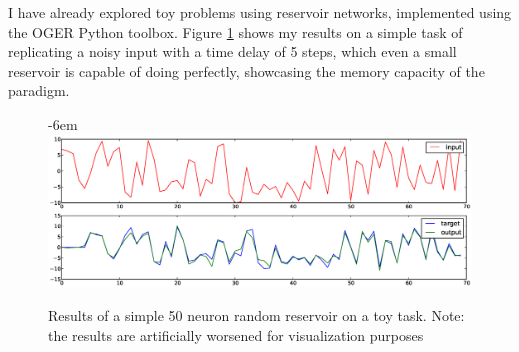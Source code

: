 \documentclass[12pt,oneside]{CUNY_CS_PhD}
\begin{document}
 I have already explored toy problems using reservoir networks, implemented using the OGER \cite{oger} Python toolbox. Figure \ref{fig:myres} shows my results on a simple task of replicating a noisy input with a time delay of 5 steps, which even a small reservoir is capable of doing perfectly, showcasing the memory capacity of the paradigm.
\begin{figure}[t]
\leftskip-6em
\includegraphics[width=\paperwidth]{pictures/my-res1.eps}
\caption{Results of a simple 50 neuron random reservoir on a toy task. Note: the results are artificially worsened for visualization
purposes}
\label{fig:myres}
\end{figure}\\


\backmatter



\end{document}
